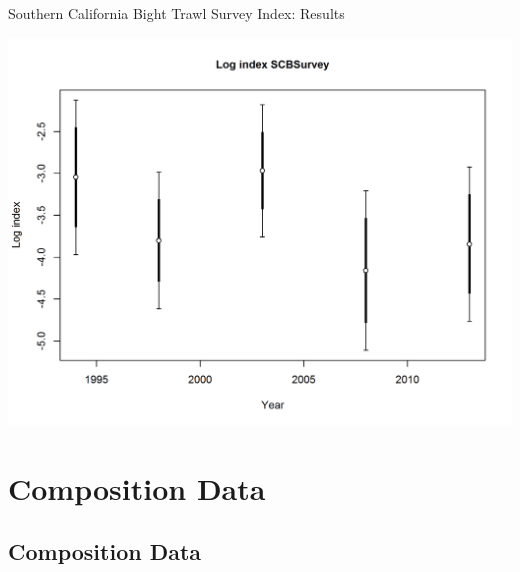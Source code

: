 \documentclass[ignorenonframetext,compress]{beamer}
\begin{document}
\begin{frame}{Southern California Bight Trawl Survey Index: Results}

\includegraphics{r4ss/plots_mod1/index4_logcpuedata_SCBSurvey.png}

\end{frame}

\section{Composition Data}\label{composition-data}

\subsection{Composition Data}\label{composition-data-1}
\end{document}
